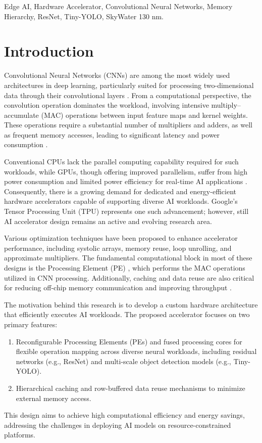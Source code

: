 \documentclass[conference]{IEEEtran}
\begin{document}
\begin{IEEEkeywords}
Edge AI, Hardware Accelerator, Convolutional Neural Networks, Memory Hierarchy, ResNet, Tiny-YOLO, SkyWater 130 nm.
\end{IEEEkeywords}

\section{Introduction}
\label{sec:intro}
Convolutional Neural Networks (CNNs) are among the most widely used architectures in deep learning, particularly suited for processing two-dimensional data through their convolutional layers \cite{CIACON2025_Optimizing_CNN}. From a computational perspective, the convolution operation dominates the workload, involving intensive multiply–accumulate (MAC) operations between input feature maps and kernel weights. These operations require a substantial number of multipliers and adders, as well as frequent memory accesses, leading to significant latency and power consumption \cite{ISCAS2025_Weight_Approximation_and_Data_Reuse}.

Conventional CPUs lack the parallel computing capability required for such workloads, while GPUs, though offering improved parallelism, suffer from high power consumption and limited power efficiency for real-time AI applications \cite{ICCSP2025_Edge_AI}. Consequently, there is a growing demand for dedicated and energy-efficient hardware accelerators capable of supporting diverse AI workloads. Google’s Tensor Processing Unit (TPU) represents one such advancement; however, still AI accelerator design remains an active and evolving research area.

Various optimization techniques have been proposed to enhance accelerator performance, including systolic arrays, memory reuse, loop unrolling, and approximate multipliers. The fundamental computational block in most of these designs is the Processing Element (PE) \cite{Usman2025}, which performs the MAC operations utilized in CNN processing. Additionally, caching and data reuse are also critical for reducing off-chip memory communication and improving throughput \cite{ISCAS2025_Weight_Approximation_and_Data_Reuse}.

The motivation behind this research is to develop a custom hardware architecture that efficiently executes AI workloads. The proposed accelerator focuses on two primary features:
\begin{enumerate}
    \item Reconfigurable Processing Elements (PEs) and fused processing cores for flexible operation mapping across diverse neural workloads, including residual networks (e.g., ResNet) and multi-scale object detection models (e.g., Tiny-YOLO).  
    \item Hierarchical caching and row-buffered data reuse mechanisms to minimize external memory access.  
\end{enumerate}
This design aims to achieve high computational efficiency and energy savings, addressing the challenges in deploying AI models on resource-constrained platforms.
\end{document}
